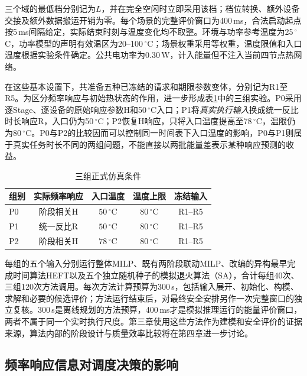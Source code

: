 三个域的最低档分别记为$L$，并在完全空闲时立即采用该档；档位转换、额外设备交接及额外数据搬运开销为零。每个场景的完整评价窗口为400\,ms，合法启动起点按5\,ms间隔给定，实际结束时刻与温度变化均不取整。环境与功率参考温度为25\,$^\circ$C，功率模型的声明有效温区为20--100\,$^\circ$C；场景权重采用等权重，温度限值和入口温度根据实验条件确定。公共电功率为0.30\,W，计入能量但不注入当前四节点热网络。

在这些基本设置下，共准备五种已冻结的请求和期限参数变体，分别记为R1至R5。为区分频率响应与初始热状态的作用，进一步形成表\ref{tab:c3-experiment-groups}中的三组实验。P0采用逐Stage、逐设备的原始响应参数H和50\,$^\circ$C入口；P1将\emph{真实执行输入}换成统一反比时长响应R，入口仍为50\,$^\circ$C；P2恢复H响应，只将入口温度提高至78\,$^\circ$C，温限仍为80\,$^\circ$C。P0与P2的比较因而可以控制同一时间表下入口温度的影响，P0与P1则属于真实任务时长不同的两组问题，不能直接以两批能量差表示某种响应预测的收益。

\begin{table}[htbp]
 \centering
 \caption{三组正式仿真条件}
 \label{tab:c3-experiment-groups}
 \begin{tabular}{lcccc}
 \toprule
 组别 & 实际频率响应 & 入口温度 & 温度上限 & 冻结输入\\
 \midrule
 P0 & 阶段相关H & $50\,^\circ$C & $80\,^\circ$C & R1--R5\\
 P1 & 统一反比R & $50\,^\circ$C & $80\,^\circ$C & R1--R5\\
 P2 & 阶段相关H & $78\,^\circ$C & $80\,^\circ$C & R1--R5\\
 \bottomrule
 \end{tabular}
\end{table}

每组的五个输入分别运行整体MILP、既有两阶段联动MILP、改编的异构最早完成时间算法HEFT以及五个独立随机种子的模拟退火算法（SA），合计每组40次、三组120次方法调用。每次方法计算预算为300\,s，包括输入展开、初始化、构模、求解和必要的候选评价；方法运行结束后，对最终安全安排另作一次完整窗口的独立复核。300\,s是离线规划的方法预算，400\,ms才是模拟推理运行的能量评价窗口，两者不属于同一个实时执行尺度。第三章使用这些方法作为建模和安全评价的证据来源，算法内部的阶段设计与质量效率比较将在第四章进一步讨论。

\subsection{频率响应信息对调度决策的影响}

